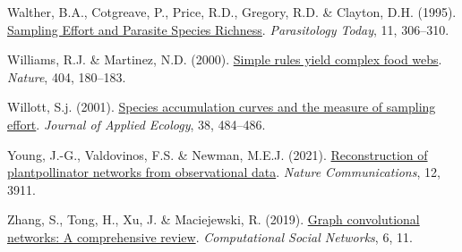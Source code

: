 \documentclass[10pt,oneside]{article}
\newlength{\cslhangindent}
\newenvironment{CSLReferences}[3] %
 {%
  \setlength{\parindent}{0pt}
  \ifodd #1 \everypar{\setlength{\hangindent}{\cslhangindent}}\ignorespaces\fi
  \ifnum #2 > 0
  \setlength{\parskip}{#2\baselineskip}
  \fi
 }%
 {}
\begin{document}
\begin{CSLReferences}{1}{0}
\leavevmode{}%
Walther, B.A., Cotgreave, P., Price, R.D., Gregory, R.D. \& Clayton,
D.H. (1995).
\href{https://doi.org/10.1016/0169-4758(95)80047-6}{Sampling Effort and
Parasite Species Richness}. \emph{Parasitology Today}, 11, 306--310.

\leavevmode{}%
Williams, R.J. \& Martinez, N.D. (2000).
\href{https://doi.org/10.1038/35004572}{Simple rules yield complex food
webs}. \emph{Nature}, 404, 180--183.

\leavevmode{}%
Willott, S.j. (2001).
\href{https://doi.org/10.1046/j.1365-2664.2001.00589.x}{Species
accumulation curves and the measure of sampling effort}. \emph{Journal
of Applied Ecology}, 38, 484--486.

\leavevmode{}%
Young, J.-G., Valdovinos, F.S. \& Newman, M.E.J. (2021).
\href{https://doi.org/10.1038/s41467-021-24149-x}{Reconstruction of
plantpollinator networks from observational data}. \emph{Nature
Communications}, 12, 3911.

\leavevmode{}%
Zhang, S., Tong, H., Xu, J. \& Maciejewski, R. (2019).
\href{https://doi.org/10.1186/s40649-019-0069-y}{Graph convolutional
networks: A comprehensive review}. \emph{Computational Social Networks},
6, 11.

\end{CSLReferences}
\end{document}
